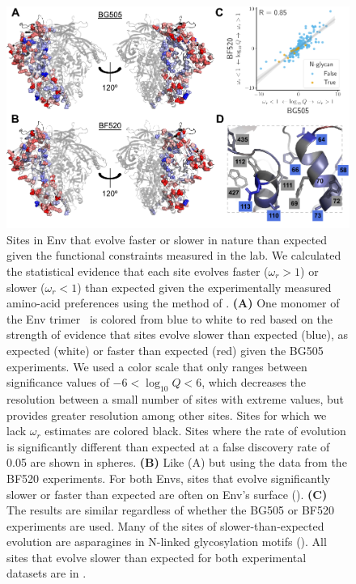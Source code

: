 \documentclass[9pt]{elife}
\begin{document}
\begin{figure}
\includegraphics[width=1.0\textwidth]{figures/omegabysite_structural_analysis/omegabysite_structural_analysis.pdf}
\caption{\label{fig:divsel}
Sites in Env that evolve faster or slower in nature than expected given the functional constraints measured in the lab.
We calculated the statistical evidence that each site evolves faster ($\omega_r > 1$) or slower ($\omega_r < 1$) than expected given the experimentally measured amino-acid preferences using the method of \citet{bloom2017identification}.
{\bf (A)}
One monomer of the Env trimer~\citep[PDB 5FYL;][]{stewart2016trimeric} is colored from blue to white to red based on the strength of evidence that sites evolve slower than expected (blue), as expected (white) or faster than expected (red) given the BG505 experiments.
We used a color scale that only ranges between significance values of $-6 < \log_{10}Q < 6$, which decreases the resolution between a small number of sites with extreme values, but provides greater resolution among other sites.
Sites for which we lack $\omega_r$ estimates are colored black.
Sites where the rate of evolution is significantly different than expected at a false discovery rate of 0.05 are shown in spheres.
{\bf (B)}
Like (A) but using the data from the BF520 experiments.
For both Envs, sites that evolve significantly slower or faster than expected are often on Env's surface ().
{\bf (C)}
The results are similar regardless of whether the BG505 or BF520 experiments are used.
Many of the sites of slower-than-expected evolution are asparagines in N-linked glycosylation motifs ().
All sites that evolve slower than expected for both experimental datasets are in .
}
\end{figure}
\end{document}
